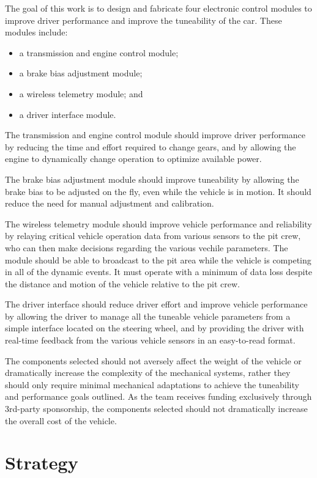 The goal of this work is to design and fabricate four electronic control modules to improve driver performance and improve the tuneability of the car. These modules include:

\begin{itemize}
\item a transmission and engine control module;
\item a brake bias adjustment module;
\item a wireless telemetry module; and
\item a driver interface module.
\end{itemize}

The transmission and engine control module should improve driver performance by reducing the time and effort required to change gears, and by allowing the engine to dynamically change operation to optimize available power. 

The brake bias adjustment module should improve tuneability by allowing the brake bias to be adjusted on the fly, even while the vehicle is in motion. It should reduce the need for manual adjustment and calibration.

The wireless telemetry module should improve vehicle performance and reliability by relaying critical vehicle operation data from various sensors to the pit crew, who can then make decisions regarding the various vechile parameters. The module should be able to broadcast to the pit area while the vehicle is competing in all of the dynamic events. It must operate with a minimum of data loss despite the distance and motion of the vehicle relative to the pit crew.

The driver interface should reduce driver effort and improve vehicle performance by allowing the driver to manage all the tuneable vehicle parameters from a simple interface located on the steering wheel, and by providing the driver with real-time feedback from the various vehicle sensors in an easy-to-read format. 

The components selected should not aversely affect the weight of the vehicle or dramatically increase the complexity of the mechanical systems, rather they should only require minimal mechanical adaptations to achieve the tuneability and performance goals outlined. As the team receives funding exclusively through 3rd-party sponsorship, the components selected should not dramatically increase the overall cost of the vehicle. 

\section{Strategy}

